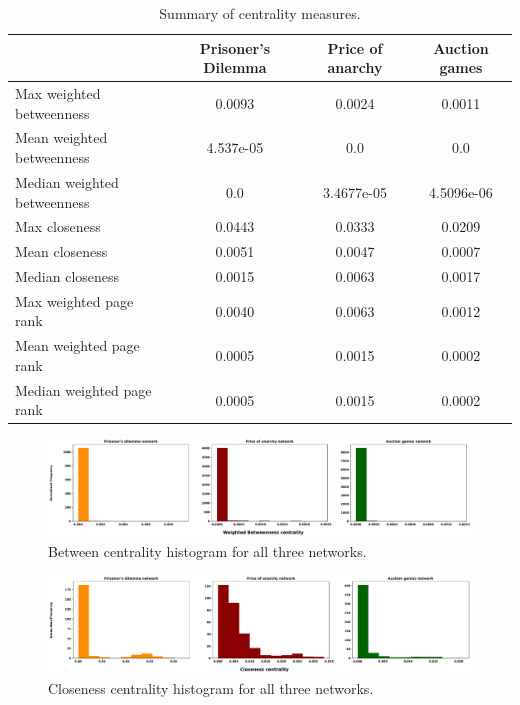 \documentclass{article}
\begin{document}
\begin{table}[!hbtp]
    \begin{center}
    \begin{tabular}{lccc}
\toprule
& Prisoner's Dilemma & Price of anarchy &  Auction games \\
\midrule
Max weighted betweenness     & 0.0093     & 0.0024     & 0.0011 \\
Mean weighted betweenness    & 4.537e-05  & 0.0        &  0.0 \\
Median weighted betweenness  & 0.0        & 3.4677e-05 & 4.5096e-06 \\
Max closeness                & 0.0443     & 0.0333     & 0.0209 \\
Mean closeness               & 0.0051     & 0.0047     & 0.0007 \\
Median closeness             & 0.0015     & 0.0063     & 0.0017 \\
Max weighted page rank       & 0.0040     & 0.0063     & 0.0012 \\
Mean weighted page rank      & 0.0005     & 0.0015     & 0.0002 \\
Median weighted page rank    & 0.0005     & 0.0015     & 0.0002 \\
\bottomrule
    \end{tabular}
    \end{center}
    \caption{Summary of centrality measures.}\label{table:summary_centrality_networks}
\end{table}

\begin{figure}[!hbtp]
    \centering
    \includegraphics[width=\textwidth]{./assets/images/w_betweenness_hist.pdf}
    \caption{Between centrality histogram for all three networks.}
    \label{fig:w_betweenness_hist}
\end{figure}

\begin{figure}[!hbtp]
    \centering
    \includegraphics[width=\textwidth]{./assets/images/closeness_hist.pdf}
    \caption{Closeness centrality histogram for all three networks.}
    \label{fig:closeness_hist}
\end{figure}
\end{document}

